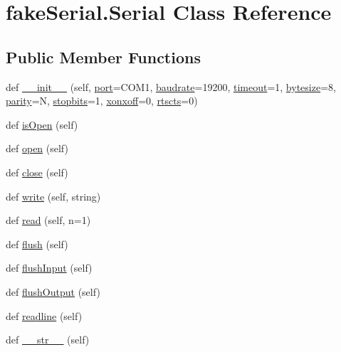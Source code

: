 \hypertarget{classfake_serial_1_1_serial}{}\section{fake\+Serial.\+Serial Class Reference}
\label{classfake_serial_1_1_serial}
\subsection*{Public Member Functions}
\begin{DoxyCompactItemize}
\item 
def \mbox{\hyperlink{classfake_serial_1_1_serial_abcf3b27b5edb193420574f383ff1603c}{\+\_\+\+\_\+init\+\_\+\+\_\+}} (self, \mbox{\hyperlink{classfake_serial_1_1_serial_a53d2e25f2f6b6654ba6740cb57242758}{port}}=\textquotesingle{}C\+O\+M1\textquotesingle{}, \mbox{\hyperlink{classfake_serial_1_1_serial_afe5ee18e12722951265fdd9d4fa81a51}{baudrate}}=19200, \mbox{\hyperlink{classfake_serial_1_1_serial_aac1940cde2e2c8018d9be60b53bd6644}{timeout}}=1, \mbox{\hyperlink{classfake_serial_1_1_serial_afc2c7273bcb952833c250bda88ba2d08}{bytesize}}=8, \mbox{\hyperlink{classfake_serial_1_1_serial_a0b5e1c24e2dd47ba832bd4a26b5c0027}{parity}}=\textquotesingle{}N\textquotesingle{}, \mbox{\hyperlink{classfake_serial_1_1_serial_ac0e590a34ac343c929e4a8543e933cce}{stopbits}}=1, \mbox{\hyperlink{classfake_serial_1_1_serial_a66d563b6efbcddbe5b6b295f5446a268}{xonxoff}}=0, \mbox{\hyperlink{classfake_serial_1_1_serial_aadb7fe53208ef570c79b1b66d8eb2ad7}{rtscts}}=0)
\item 
def \mbox{\hyperlink{classfake_serial_1_1_serial_a69cc2297e7c5bfb87de4df789774f3a2}{is\+Open}} (self)
\item 
def \mbox{\hyperlink{classfake_serial_1_1_serial_a2e4137a108e41f23e49735667d9b4c05}{open}} (self)
\item 
def \mbox{\hyperlink{classfake_serial_1_1_serial_a183f0034571d103c4c90c041e6643557}{close}} (self)
\item 
def \mbox{\hyperlink{classfake_serial_1_1_serial_abc4ef915d782f9e4a8d1d6f398298a6d}{write}} (self, string)
\item 
def \mbox{\hyperlink{classfake_serial_1_1_serial_a46f1021e19572ff944e886e53a51a1d1}{read}} (self, n=1)
\item 
def \mbox{\hyperlink{classfake_serial_1_1_serial_a3c34cb0659b6d0dd5924ac79d79ad6bf}{flush}} (self)
\item 
def \mbox{\hyperlink{classfake_serial_1_1_serial_a6abb75597f64f245df8e0c7f62c7fde5}{flush\+Input}} (self)
\item 
def \mbox{\hyperlink{classfake_serial_1_1_serial_afecff2730c11a9a8e7f687c57a2c738a}{flush\+Output}} (self)
\item 
def \mbox{\hyperlink{classfake_serial_1_1_serial_a58f35303f074c25e972c0b16c6382bf4}{readline}} (self)
\item 
def \mbox{\hyperlink{classfake_serial_1_1_serial_a597b04385c851077ccc3363f4bfb32c1}{\+\_\+\+\_\+str\+\_\+\+\_\+}} (self)
\end{DoxyCompactItemize}
